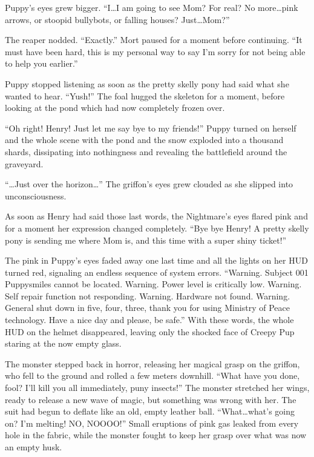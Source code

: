 Puppy's eyes grew bigger. ``I\dots I am going to see Mom? For real? No more\dots pink arrows, or stoopid bullybots, or falling houses? Just\dots Mom?''

The reaper nodded. ``Exactly.'' Mort paused for a moment before continuing. ``It must have been hard, this is my personal way to say I'm sorry for not being able to help you earlier.''

Puppy stopped listening as soon as the pretty skelly pony had said what she wanted to hear. ``Yush!'' The foal hugged the skeleton for a moment, before looking at the pond which had now completely frozen over.

``Oh right! Henry! Just let me say bye to my friends!'' Puppy turned on herself and the whole scene with the pond and the snow exploded into a thousand shards, dissipating into nothingness and revealing the battlefield around the graveyard.

\horizonline

``\dots Just over the horizon\dots'' The griffon's eyes grew clouded as she slipped into unconsciousness.

As soon as Henry had said those last words, the Nightmare's eyes flared pink and for a moment her expression changed completely. ``Bye bye Henry! A pretty skelly pony is sending me where Mom is, and this time with a super shiny ticket!''

The pink in Puppy's eyes faded away one last time and all the lights on her HUD turned red, signaling an endless sequence of system errors. ``{\mt Warning. Subject 001 Puppysmiles cannot be located. Warning. Power level is critically low. Warning. Self repair function not responding. Warning. Hardware not found. Warning. General shut down in five, four, three, thank you for using Ministry of Peace technology. Have a nice day and please, be safe.}'' With these words, the whole HUD on the helmet disappeared, leaving only the shocked face of Creepy Pup staring at the now empty glass.

The monster stepped back in horror, releasing her magical grasp on the griffon, who fell to the ground and rolled a few meters downhill. ``What have you done, fool? I'll kill you all immediately, puny insects!'' The monster stretched her wings, ready to release a new wave of magic, but something was wrong with her. The suit had begun to deflate like an old, empty leather ball. ``What\dots what's going on? I'm melting! NO, NOOOO!'' Small eruptions of pink gas leaked from every hole in the fabric, while the monster fought to keep her grasp over what was now an empty husk.

